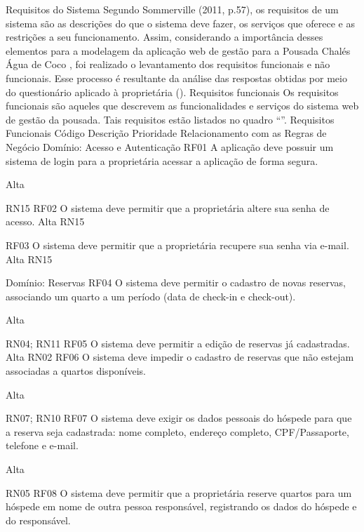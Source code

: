 Requisitos do Sistema
Segundo Sommerville (2011, p.57), os requisitos de um sistema são as descrições do que o sistema deve fazer, os serviços que oferece e as restrições a seu funcionamento. Assim, considerando a importância desses elementos para a modelagem da aplicação web de gestão para a Pousada Chalés Água de Coco , foi realizado o levantamento dos requisitos funcionais e não funcionais. Esse processo é resultante da análise das respostas obtidas por meio do questionário aplicado à proprietária (). 
Requisitos funcionais
Os requisitos funcionais são aqueles que descrevem as funcionalidades e serviços do sistema web de gestão da pousada. Tais requisitos estão listados no quadro “”.
Requisitos Funcionais
Código
Descrição
Prioridade
Relacionamento com as Regras de Negócio
Domínio: Acesso e Autenticação
RF01
A aplicação deve possuir um sistema de login para a proprietária acessar a aplicação de forma segura.




Alta




RN15
RF02
O sistema deve permitir que a proprietária altere sua senha de acesso. 
Alta
RN15


RF03
O sistema deve permitir que a proprietária recupere sua senha via e-mail.
Alta
RN15


Domínio: Reservas
RF04
O sistema deve permitir o cadastro de novas reservas, associando um quarto a um período (data de check-in e check-out).




Alta




RN04; RN11
RF05
O sistema deve permitir a edição de reservas já cadastradas.
Alta
RN02
RF06
O sistema deve impedir o cadastro de reservas que não estejam associadas a quartos disponíveis.




Alta




RN07; RN10
RF07
O sistema deve exigir os dados pessoais do hóspede para que a reserva seja cadastrada: nome completo, endereço completo, CPF/Passaporte, telefone e e-mail.










Alta






RN05 
RF08
O sistema deve permitir que a proprietária reserve quartos para um hóspede em nome de outra pessoa responsável, registrando os dados do hóspede e do responsável.








